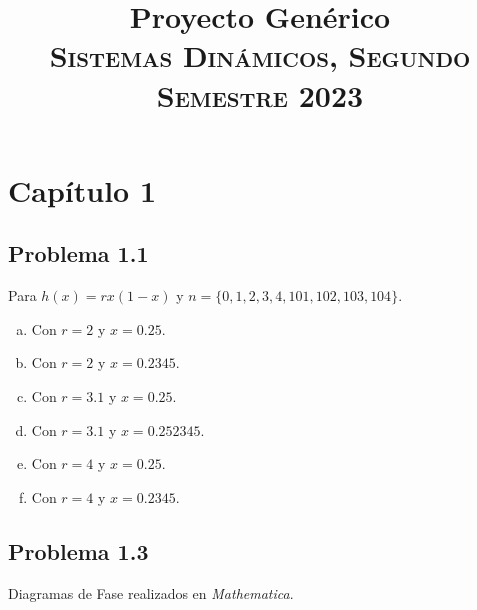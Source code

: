 \documentclass[conference]{IEEEtran}
\begin{document}
\title{Proyecto Genérico \\
{\footnotesize \scshape{Sistemas Dinámicos, Segundo Semestre 2023}}
}

\author{
}



\maketitle


\section{Capítulo 1}

\subsection{Problema 1.1}
Para $h(x) = rx(1-x)$ y $n = \{ 0,1,2,3,4,101,102,103,104 \}$.

\begin{enumerate}[a)]
	\item Con $r = 2$ y $x = 0.25$.
	\item Con $r = 2$ y $x = 0.2345$.
	\item Con $r = 3.1$ y $x = 0.25$.
	\item Con $r = 3.1$ y $x = 0.252345$.
	\item Con $r = 4$ y $x = 0.25$.
	\item Con $r = 4$ y $x = 0.2345$.
\end{enumerate}




\subsection{Problema 1.3}
Diagramas de Fase realizados en \textit{Mathematica}.
\end{document}
